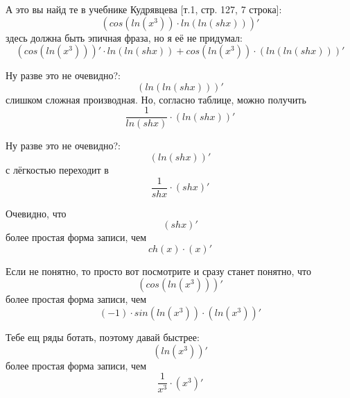 \documentclass[a4paper, 12pt]{article}
\begin{document}
А это вы найд те в учебнике Кудрявцева [т.1, стр. 127, 7 строка]:
\begin{equation}
\left(cos\left(ln\left(x^{3}\right)\right) \cdot ln\left(ln\left(shx\right)\right) \right)'
\end{equation}
здесь должна быть эпичная фраза, но я её не придумал:
\begin{equation}
\left(cos\left(ln\left(x^{3}\right)\right) \right)' \cdot ln\left(ln\left(shx\right)\right) + cos\left(ln\left(x^{3}\right)\right)\cdot \left( ln\left(ln\left(shx\right)\right) \right)'
\end{equation}

Ну разве это не очевидно?:
\begin{equation}
\left(ln\left(ln\left(shx\right)\right) \right)'
\end{equation}
слишком сложная производная. Но, согласно таблице, можно получить
\begin{equation}
\frac{1}{ln\left(shx\right)} \cdot \left(ln\left(shx\right) \right)'
\end{equation}

Ну разве это не очевидно?:
\begin{equation}
\left(ln\left(shx\right) \right)'
\end{equation}
с лёгкостью переходит в
\begin{equation}
\frac{1}{shx} \cdot \left(shx \right)'
\end{equation}

Очевидно, что
\begin{equation}
\left(shx \right)'
\end{equation}
более простая форма записи, чем
\begin{equation}
ch \left( x \right) \cdot \left( x \right)'
\end{equation}

Если не понятно, то просто вот посмотрите и сразу станет понятно, что
\begin{equation}
\left(cos\left(ln\left(x^{3}\right)\right) \right)'
\end{equation}
более простая форма записи, чем
\begin{equation}
(-1) \cdot sin \left( ln\left(x^{3}\right) \right) \cdot \left( ln\left(x^{3}\right) \right)'
\end{equation}

Тебе ещ ряды ботать, поэтому давай быстрее:
\begin{equation}
\left(ln\left(x^{3}\right) \right)'
\end{equation}
более простая форма записи, чем
\begin{equation}
\frac{1}{x^{3}} \cdot \left(x^{3} \right)'
\end{equation}
\end{document}
